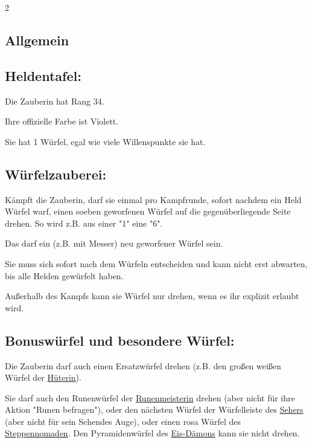 \documentclass[10pt, a4paper, oneside]{book}
\begin{document}
\begin{multicols*}{2}\raggedcolumns


\begin{nobgcolor}

\section{Allgemein}



\subsection{Heldentafel:}

Die Zauberin hat Rang 34.

Ihre offizielle Farbe ist Violett.

Sie hat 1 Würfel, egal wie viele Willenspunkte sie hat.




\subsection{Würfelzauberei:}

Kämpft die Zauberin, darf sie einmal pro Kampfrunde, sofort nachdem ein Held Würfel warf, einen soeben geworfenen Würfel auf die gegenüberliegende Seite drehen. So wird z.B. aus einer "1" eine "6".

Das darf ein (z.B. mit Messer) neu geworfener Würfel sein.

Sie muss sich sofort nach dem Würfeln entscheiden und kann nicht erst abwarten, bis alle Helden gewürfelt haben.
\supercite{dlva-begleitheft,dlh-begleitheft,dek-begleitheft}

Außerhalb des Kampfs kann sie Würfel nur drehen, wenn es ihr explizit erlaubt wird.




\subsection{Bonuswürfel und besondere Würfel:}

Die Zauberin darf auch einen Ersatzwürfel drehen (z.B. den großen weißen Würfel der \hyperref[hueterin]{Hüterin}\supercite{5335}).
\supercite{dlva-begleitheft,dlva2-runensteine,dridn-begleitheft}

Sie darf auch den Runenwürfel der \hyperref[runenmeisterin]{Runenmeisterin} drehen\supercite{88563} (aber nicht für ihre Aktion "Runen befragen"), oder den nächsten Würfel der Würfelleiste des \hyperref[seher]{Sehers} (aber nicht für sein Sehendes Auge)\supercite{dh-faq}, oder einen rosa Würfel des \hyperref[steppennomade]{Steppennomaden}. Den Pyramidenwürfel des \hyperref[eis-daemon]{Eis-Dämons} kann sie nicht drehen.
\supercite{91842}






\end{nobgcolor}
\end{multicols*}
\end{document}

